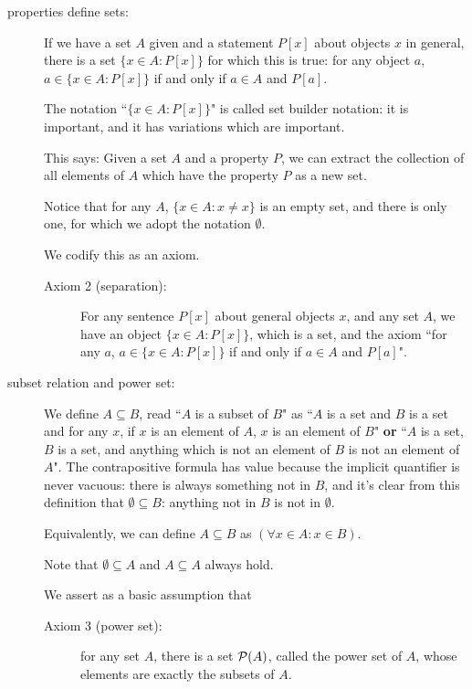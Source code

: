 \documentclass[12pt]{article}
\begin{document}
\begin{description}
\item[properties define sets:]  If we have a set $A$ given and a statement $P[x]$ about objects  $x$ in general, there is a set
$\{x \in A:P[x]\}$ for which this is true:  for any object $a$, $a \in \{x \in A:P[x]\}$ if and only if $a \in A$ and $P[a]$.

The notation ``$\{x \in A:P[x]\}$" is called set builder notation:  it is important, and it has variations which are important.

This says:  Given a set $A$ and a property $P$, we can extract the collection of all elements of $A$ which have the property $P$ as a new set.

Notice that for any $A$, $\{x \in A:x \neq x\}$ is an empty set, and there is only one, for which we adopt the notation $\emptyset$.

We codify this as an axiom.

\begin{description}

\item[Axiom 2 (separation):]  For any sentence $P[x]$ about general objects $x$, and any set $A$, we have
an object $\{x \in A:P[x]\}$, which is a set, and the axiom ``for any $a$, $a \in \{x \in A:P[x]\}$ if and only if $a \in A$ and $P[a]$".

\end{description}

\item[subset relation and power set:]  We define $A \subseteq B$, read ``$A$ is a subset of $B$" as  ``$A$ is a set and $B$ is a set and for any $x$, if $x$ is an element of $A$, $x$ is an element of $B$" {\bf or}  ``$A$ is a set, $B$ is a set, and anything which is not an element of $B$ is not an element of $A$".  The contrapositive formula has value because the implicit quantifier is never vacuous:  there is always something not in $B$, and it's clear from this definition that $\emptyset \subseteq B$:  anything not in $B$ is not in $\emptyset$.

Equivalently, we can define $A \subseteq B$ as $(\forall x \in A: x\in B)$.

Note that $\emptyset \subseteq A$ and $A \subseteq A$ always hold.

We assert as a basic assumption that 

\begin{description}

\item[Axiom 3 (power set):]  for any set $A$, there is a set ${\cal P}(A)$, called the power set of $A$, whose elements are exactly the subsets of $A$.


\end{description}
\end{description}
\end{document}

